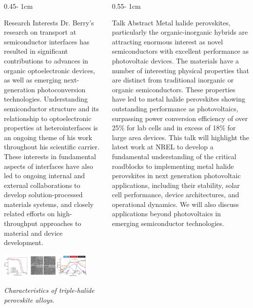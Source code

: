 \documentclass{../psuposter}
\begin{document}
\begin{frame}
\begin{columns}[t, totalwidth=\textwidth]
\begin{column}{0.45\textwidth - 1cm}
    \begin{block}{Research Interests}
        Dr. Berry's research on transport at semiconductor interfaces has resulted in significant contributions to advances in organic optoelectronic devices, as well as emerging next-generation photoconversion technologies. Understanding semiconductor structure and its relationship to optoelectronic properties at heterointerfaces is an ongoing theme of his work throughout his scientific carrier. These interests in fundamental aspects of interfaces have also led to ongoing internal and external collaborations to develop solution-processed materials systems, and closely related efforts on high-throughput approaches to material and device development.
        \begin{center}
	    	\includegraphics[width=0.85\textwidth]{images/alloy-characteristics}    		
    	\end{center}
    	\textit{Characteristics of triple-halide perovskite alloys}. \cite{xuTriplehalideWideBand2020}
    \end{block}
\end{column}
\begin{column}{0.55\textwidth - 1cm}


    \begin{block}{Talk Abstract}
        Metal halide perovskites, particularly the organic-inorganic hybrids are attracting enormous interest as novel semiconductors with excellent performance as photovoltaic devices.  The materials have a number of interesting physical properties that are distinct from traditional inorganic or organic semiconductors. These properties have led to metal halide perovskites showing outstanding performance as photovoltaics, surpassing power conversion efficiency of over 25\% for lab cells and in excess of 18\% for large area devices. This talk will highlight the latest work at NREL to develop a fundamental understanding of the critical roadblocks to implementing metal halide perovskites in next generation photovoltaic applications, including their stability, solar cell performance, device architectures, and operational dynamics. We will also discuss applications beyond photovoltaics in emerging semiconductor technologies. 
    \end{block}



\end{column}
\end{columns}
\end{frame}
\end{document}
